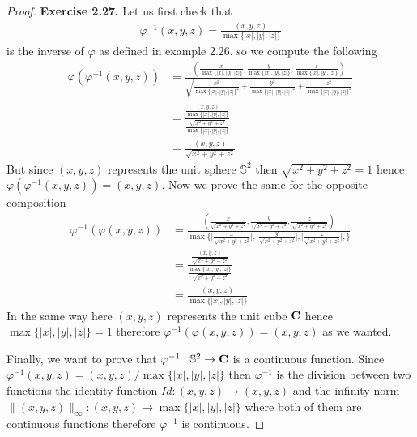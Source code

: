 \documentclass[11pt]{article}
\theoremstyle{definition}
\begin{document}
\begin{proof}{\textbf{Exercise 2.27.}}
    Let us first check that
    \begin{align*}
        \varphi^{-1}(x,y,z) = \frac{(x,y,z)}{\max\{|x|,|y|,|z|\}}
    \end{align*}
    is the inverse of $\varphi$ as defined in example 2.26. so we compute the
    following
    \begin{align*}
        \varphi(\varphi^{-1}(x,y,z)) &=
        \frac{
            (\frac{x}{\max\{|x|,|y|,|z|\}},
            \frac{y}{\max\{|x|,|y|,|z|\}},
            \frac{z}{\max\{|x|,|y|,|z|\}})
        }{
            \sqrt{
                \frac{x^2}{\max\{|x|,|y|,|z|\}^2} +
                \frac{y^2}{\max\{|x|,|y|,|z|\}^2} +
                \frac{z^2}{\max\{|x|,|y|,|z|\}^2}
            }
        }\\
        &= \frac{\frac{(x, y, z)}{\max\{|x|,|y|,|z|\}}}{
            \frac{\sqrt{x^2 + y^2 + z^2}}{\max\{|x|,|y|,|z|\}}}\\
        &=\frac{(x, y, z)}{\sqrt{x^2 + y^2 + z^2}} 
    \end{align*}
    But since $(x,y,z)$ represents the unit sphere $\mathbb{S}^2$ then
    $\sqrt{x^2 + y^2 + z^2} = 1$ hence $\varphi(\varphi^{-1}(x,y,z)) = (x,y,z)$.
    Now we prove the same for the opposite composition
    \begin{align*}
        \varphi^{-1}(\varphi(x,y,z)) &=
        \frac{
            (\frac{x}{\sqrt{x^2 + y^2 + z^2}},
            \frac{y}{\sqrt{x^2 + y^2 + z^2}},
            \frac{z}{\sqrt{x^2 + y^2 + z^2}})
        }{
            \max\bigg\{
                \bigg|\frac{x}{\sqrt{x^2 + y^2 + z^2}}\bigg|,
                \bigg|\frac{y}{\sqrt{x^2 + y^2 + z^2}}\bigg|,
                \bigg|\frac{z}{\sqrt{x^2 + y^2 + z^2}}\bigg|,
            \bigg\}
        }\\
        &= \frac{\frac{(x, y, z)}{\sqrt{x^2 + y^2 + z^2}}}{
            \frac{\max\{|x|,|y|,|z|\}}{\sqrt{x^2 + y^2 + z^2}}}\\
        &=\frac{(x,y,z)}{\max\{|x|,|y|,|z|\}}
    \end{align*}
    In the same way here $(x,y,z)$ represents the unit cube $\bf{C}$ hence\\
    $\max\{|x|, |y|, |z|\} = 1$ therefore
    $\varphi^{-1}(\varphi(x,y,z)) = (x,y,z)$ as we wanted.

    Finally, we want to prove that $\varphi^{-1}: \mathbb{S}^2 \to \bf{C}$ is
    a continuous function.
    Since $\varphi^{-1}(x,y,z) = (x,y,z)/\max\{|x|, |y|, |z|\}$ then
    $\varphi^{-1}$ is the division between two functions the identity function
    $Id: (x,y,z) \to (x,y,z)$ and the infinity norm
    $\|(x,y,z)\|_\infty:(x,y,z) \to \max\{|x|, |y|, |z|\}$ where both of them
    are continuous functions therefore $\varphi^{-1}$ is continuous.
\end{proof}
\end{document}

